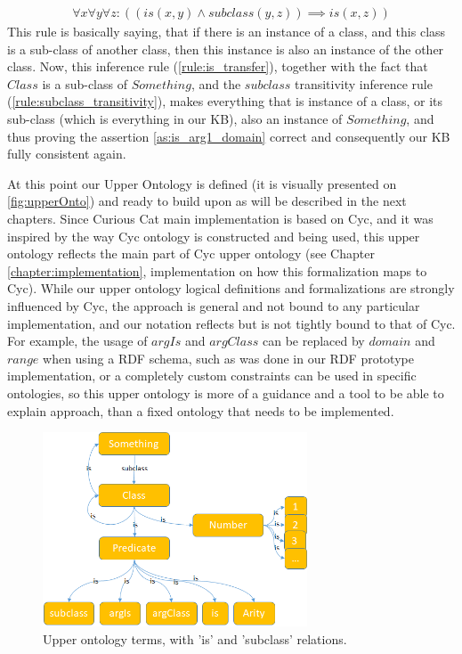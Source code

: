 \begin{equation}\label{rule:is_transfer}
\begin{gathered}
  \forall x \forall y \forall z: ((is(x,y) \land subclass(y,z)) \implies is(x,z))
\end{gathered} \end{equation}
This rule is basically saying, that if there is an instance of a class, and this
class is a sub-class of another class, then this instance is also an instance of
the other class. Now, this inference rule (\ref{rule:is_transfer}), together 
with the fact that $Class$ is a sub-class of $Something$, and the $subclass$
transitivity inference rule (\ref{rule:subclass_transitivity}), makes everything
 that is instance of a 
class, or its sub-class (which is everything in our KB), also an instance of
$Something$, and thus proving the assertion \ref{as:is_arg1_domain} correct and 
consequently our KB fully consistent again.

At this point our Upper Ontology is defined (it is visually presented on
\autoref{fig:upperOnto}) and ready to build upon as will be
described in the next chapters. Since Curious Cat main implementation is based
on Cyc, and it was inspired by the way Cyc ontology is constructed and being 
used, this upper ontology reflects the main part of Cyc upper ontology 
(see Chapter \ref{chapter:implementation}, implementation on how this 
formalization maps to Cyc). While our upper ontology logical definitions and 
formalizations are strongly influenced by Cyc, the approach is general and not 
bound to any particular implementation, and our notation reflects but is not 
tightly bound to that of Cyc. For example, the usage of $argIs$ and $argClass$
can be replaced by $domain$ and $range$ when using a RDF schema, such as was 
done in our RDF prototype implementation\parencite{Bradesko2012a}, or a 
completely custom constraints can be used in specific ontologies, so this
upper ontology is more of a guidance and a tool to be able to explain approach,
than a fixed ontology that needs to be implemented.

\begin{figure}[H]
	\centering
		\includegraphics[width=0.7\textwidth]{figures/upperOntology.png}
	\caption{Upper ontology terms, with 'is' and 'subclass' relations.}
	\label{fig:upperOnto}
\end{figure}


